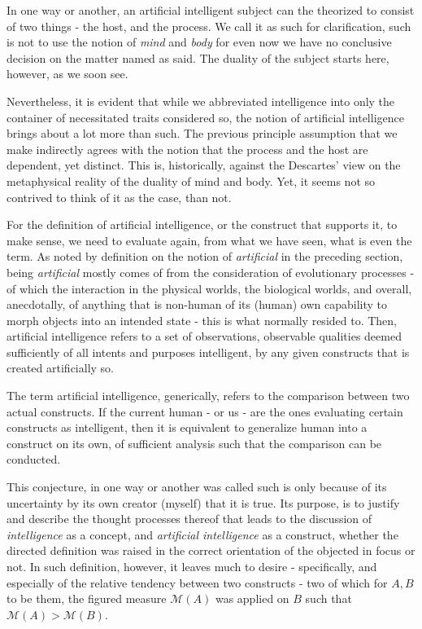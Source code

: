 In one way or another, an artificial intelligent subject can the theorized to consist of two things - the host, and the process. We call it as such for clarification, such is not to use the notion of \textit{mind} and \textit{body} for even now we have no conclusive decision on the matter named as said. The duality of the subject starts here, however, as we soon see.

Nevertheless, it is evident that while we abbreviated intelligence into only the container of necessitated traits considered so, the notion of artificial intelligence brings about a lot more than such. The previous principle assumption that we make indirectly agrees with the notion that the process and the host are dependent, yet distinct. This is, historically, against the Descartes' view on the metaphysical reality of the duality of mind and body. Yet, it seems not so contrived to think of it as the case, than not.

For the definition of artificial intelligence, or the construct that supports it, to make sense, we need to evaluate again, from what we have seen, what is even the term. As noted by definition on the notion of \textit{artificial} in the preceding section, being \textit{artificial} mostly comes of from the consideration of evolutionary processes - of which the interaction in the physical worlds, the biological worlds, and overall, anecdotally, of anything that is non-human of its (human) own capability to morph objects into an intended state - this is what normally resided to. Then, artificial intelligence refers to a set of observations, observable qualities deemed sufficiently of all intents and purposes intelligent, by any given constructs that is created artificially so.

\begin{hypothesis}
    The term artificial intelligence, generically, refers to the comparison between two actual constructs. If the current human - or us - are the ones evaluating certain constructs as intelligent, then it is equivalent to generalize human into a construct on its own, of sufficient analysis such that the comparison can be conducted.
\end{hypothesis}

This conjecture, in one way or another was called such is only because of its uncertainty by its own creator (myself) that it is true. Its purpose, is to justify and describe the thought processes thereof that leads to the discussion of \textit{intelligence} as a concept, and \textit{artificial intelligence} as a construct, whether the directed definition was raised in the correct orientation of the objected in focus or not. In such definition, however, it leaves much to desire - specifically, and especially of the relative tendency between two constructs - two of which for $A,B$ to be them, the figured measure $\mathcal{M}(A)$ was applied on $B$ such that $\mathcal{M}(A)> \mathcal{M}(B)$. 


